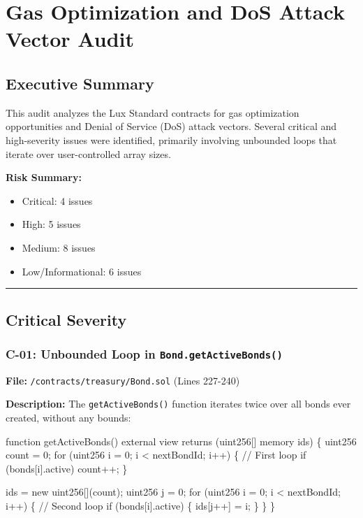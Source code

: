 \documentclass[
]{article}
\author{}
\date{}
\newenvironment{Shaded}{}{}
\newcommand{\NormalTok}[1]{#1}
\providecommand{\tightlist}{%
  \setlength{\itemsep}{0pt}\setlength{\parskip}{0pt}}
\begin{document}
\section{Gas Optimization and DoS Attack Vector
Audit}\label{gas-optimization-and-dos-attack-vector-audit}

\subsection{Executive Summary}\label{executive-summary}

This audit analyzes the Lux Standard contracts for gas optimization
opportunities and Denial of Service (DoS) attack vectors. Several
critical and high-severity issues were identified, primarily involving
unbounded loops that iterate over user-controlled array sizes.

\textbf{Risk Summary:}

\begin{itemize}
\tightlist
\item
  Critical: 4 issues
\item
  High: 5 issues
\item
  Medium: 8 issues
\item
  Low/Informational: 6 issues
\end{itemize}

\begin{center}\rule{0.5\linewidth}{0.5pt}\end{center}

\subsection{Critical Severity}\label{critical-severity}

\subsubsection{\texorpdfstring{C-01: Unbounded Loop in
\texttt{Bond.getActiveBonds()}}{C-01: Unbounded Loop in Bond.getActiveBonds()}}\label{c-01-unbounded-loop-in-bondgetactivebonds}

\textbf{File:} \texttt{/contracts/treasury/Bond.sol} (Lines 227-240)

\textbf{Description:} The \texttt{getActiveBonds()} function iterates
twice over all bonds ever created, without any bounds:

\begin{Shaded}
\begin{Highlighting}[]
\NormalTok{function getActiveBonds() external view returns (uint256[] memory ids) \{}
\NormalTok{    uint256 count = 0;}
\NormalTok{    for (uint256 i = 0; i \textless{} nextBondId; i++) \{      // First loop}
\NormalTok{        if (bonds[i].active) count++;}
\NormalTok{    \}}

\NormalTok{    ids = new uint256[](count);}
\NormalTok{    uint256 j = 0;}
\NormalTok{    for (uint256 i = 0; i \textless{} nextBondId; i++) \{      // Second loop}
\NormalTok{        if (bonds[i].active) \{}
\NormalTok{            ids[j++] = i;}
\NormalTok{        \}}
\NormalTok{    \}}
\NormalTok{\}}
\end{Highlighting}
\end{Shaded}
\end{document}
